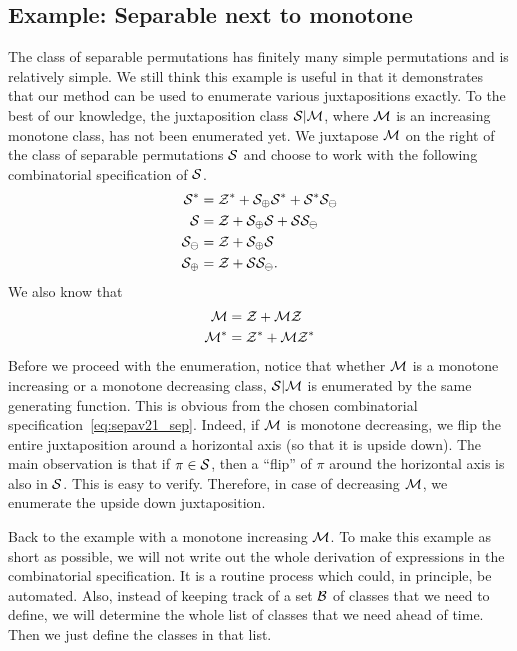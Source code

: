 \documentclass[12pt, a4paper, twoside]{report}
\begin{document}
\subsection{Example: Separable next to monotone}
\label{sec:example_sepav21}
The class of separable permutations has finitely many simple permutations and is relatively simple. We still think this example is useful in that it demonstrates that our method can be used to enumerate various juxtapositions exactly. To the best of our knowledge, the juxtaposition class $\S|\M$, where $\M$ is an increasing monotone class, has not been enumerated yet. We juxtapose $\M$ on the right of the class of separable permutations $\S$ and choose to work with the following combinatorial specification of $\S$.
\begin{align}
  \begin{aligned}
    \S^* &= \Z^* + \S_{\oplus}\S^* + \S^*\S_{\ominus}\\
    \S &= \Z + \S_{\oplus}\S + \S\S_{\ominus}\\
    \S_{\ominus} &= \Z + \S_\oplus\S\\
    \S_\oplus &= \Z + \S\S_\ominus.
    \label{eq:sepav21_sep}
  \end{aligned}
\end{align}
We also know that
\begin{align}
  \begin{aligned}
    \M &= \Z + \M\Z\\
    \Mstar &= \Zstar + \M\Zstar
  \end{aligned}
\end{align}
Before we proceed with the enumeration, notice that whether $\M$ is a monotone increasing or a monotone decreasing class, $\S|\M$ is enumerated by the same generating function. This is obvious from the chosen combinatorial specification~\eqref{eq:sepav21_sep}. Indeed, if $\M$ is monotone decreasing, we flip the entire juxtaposition around a horizontal axis (so that it is upside down). The main observation is that if $\pi \in \S$, then a ``flip'' of $\pi$ around the horizontal axis is also in $\S$. This is easy to verify. Therefore, in case of decreasing $\M$, we enumerate the upside down juxtaposition.

Back to the example with a monotone increasing $\M$. To make this example as short as possible, we will not write out the whole derivation of expressions in the combinatorial specification. It is a routine process which could, in principle, be automated. Also, instead of keeping track of a set $\B$ of classes that we need to define, we will determine the whole list of classes that we need ahead of time. Then we just define the classes in that list.
\end{document}
